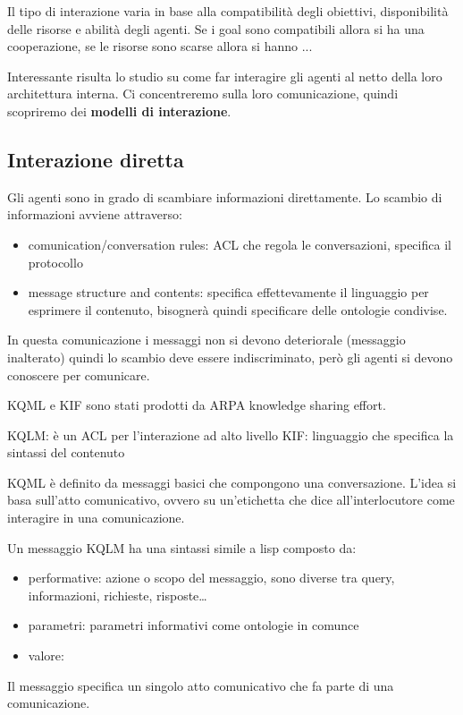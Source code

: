 Il tipo di interazione varia in base alla compatibilità degli obiettivi, disponibilità 
delle risorse e abilità degli agenti. Se i goal sono compatibili allora si ha una
cooperazione, se le risorse sono scarse allora si hanno ...

Interessante risulta lo studio su come far interagire gli agenti al netto della 
loro architettura interna. Ci concentreremo sulla loro comunicazione, quindi scopriremo
dei \textbf{modelli di interazione}.


\subsection{Interazione diretta}
Gli agenti sono in grado di scambiare informazioni direttamente. Lo scambio di informazioni
avviene attraverso:
\begin{itemize}
    \item comunication/conversation rules: ACL che regola le conversazioni, specifica il protocollo
    \item message structure and contents: specifica effettevamente il linguaggio 
    per esprimere il contenuto, bisognerà quindi specificare delle ontologie condivise.
\end{itemize}

In questa comunicazione i messaggi non si devono deteriorale (messaggio inalterato)
quindi lo scambio deve essere indiscriminato, però gli agenti si devono conoscere
per comunicare.

\begin{esempio} [KQML]
    KQML e KIF sono stati prodotti da ARPA knowledge sharing effort.

    KQLM: è un ACL per l'interazione ad alto livello
    KIF: linguaggio che specifica la sintassi del contenuto

    KQML è definito da messaggi basici che compongono una conversazione. L'idea 
    si basa sull'atto comunicativo, ovvero su un'etichetta che dice all'interlocutore 
    come interagire in una comunicazione. 

    Un messaggio KQLM ha una sintassi simile a lisp composto da:
    \begin{itemize}
        \item performative: azione o scopo del messaggio, sono diverse tra query,
        informazioni, richieste, risposte\dots
        \item parametri: parametri informativi come ontologie in comunce
        \item valore: 
    \end{itemize}
    Il messaggio specifica un singolo atto comunicativo che fa parte di una comunicazione.

\end{esempio}

